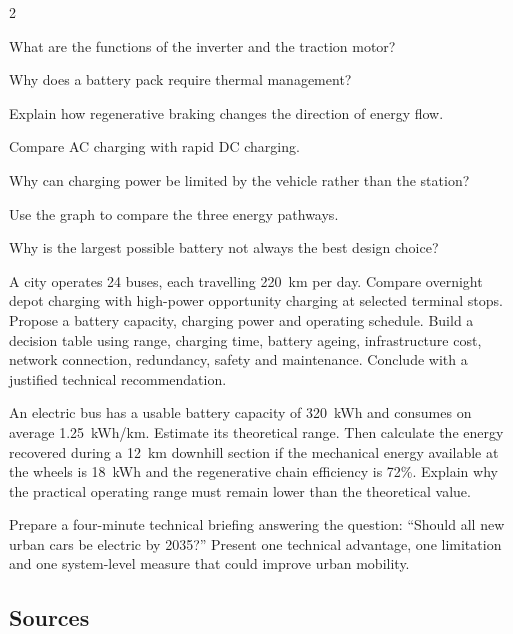 \begin{multicols}{2}
\begin{questions}
\item What are the functions of the inverter and the traction motor?
\item Why does a battery pack require thermal management?
\item Explain how regenerative braking changes the direction of energy flow.
\item Compare AC charging with rapid DC charging.
\item Why can charging power be limited by the vehicle rather than the station?
\item Use the graph to compare the three energy pathways.
\item Why is the largest possible battery not always the best design choice?
\end{questions}

\begin{engineeringchallenge}
A city operates 24 buses, each travelling 220~km per day. Compare overnight depot charging with high-power opportunity charging at selected terminal stops. Propose a battery capacity, charging power and operating schedule. Build a decision table using range, charging time, battery ageing, infrastructure cost, network connection, redundancy, safety and maintenance. Conclude with a justified technical recommendation.
\end{engineeringchallenge}

\begin{applicationexercise}
An electric bus has a usable battery capacity of 320~kWh and consumes on average 1.25~kWh/km. Estimate its theoretical range. Then calculate the energy recovered during a 12~km downhill section if the mechanical energy available at the wheels is 18~kWh and the regenerative chain efficiency is 72\%. Explain why the practical operating range must remain lower than the theoretical value.
\end{applicationexercise}

\begin{speaking}
Prepare a four-minute technical briefing answering the question: ``Should all new urban cars be electric by 2035?'' Present one technical advantage, one limitation and one system-level measure that could improve urban mobility.
\end{speaking}
\end{multicols}

\subsection*{Sources}
